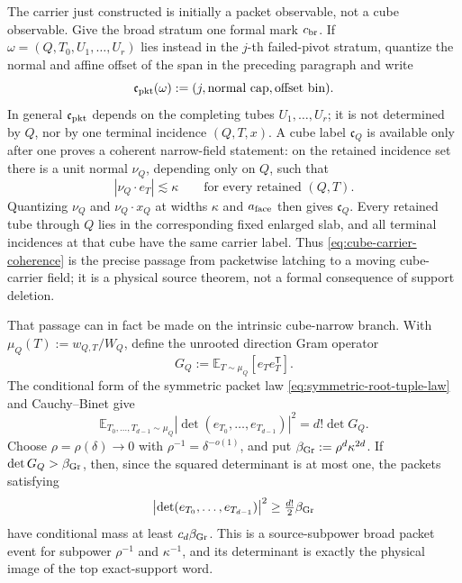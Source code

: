 \documentclass[11pt]{article}
\begin{document}
The carrier just constructed is initially a packet observable, not a cube
observable.  Give the broad stratum one formal mark \(c_{\rm br}\).  If
\(\omega=(Q,T_0,U_1,\ldots,U_r)\) lies instead in the \(j\)-th failed-pivot
stratum, quantize the normal and affine offset of the span in the preceding
paragraph and write
\begin{equation}\label{eq:packet-carrier-label}
 \mathfrak c_{\rm pkt}(\omega)
 :=(j,\text{normal cap},\text{offset bin}).
\end{equation}
In general \(\mathfrak c_{\rm pkt}\) depends on the completing tubes
\(U_1,\ldots,U_r\); it is not determined by \(Q\), nor by one terminal
incidence \((Q,T,x)\).  A cube label \(\mathfrak c_Q\) is available only after
one proves a coherent narrow-field statement: on the retained incidence set
there is a unit normal \(\nu_Q\), depending only on \(Q\), such that
\begin{equation}\label{eq:cube-carrier-coherence}
 |\nu_Q\cdot e_T|\lesssim\kappa
 \qquad\text{for every retained }(Q,T).
\end{equation}
Quantizing \(\nu_Q\) and \(\nu_Q\cdot x_Q\) at widths
\(\kappa\) and \(a_{\rm face}\) then gives \(\mathfrak c_Q\).  Every retained
tube through \(Q\) lies in the corresponding fixed enlarged slab, and all
terminal incidences at that cube have the same carrier label.  Thus
\eqref{eq:cube-carrier-coherence} is the precise passage from packetwise
latching to a moving cube-carrier field; it is a physical source theorem, not a
formal consequence of support deletion.

That passage can in fact be made on the intrinsic cube-narrow branch.  With
\(\mu_Q(T):=w_{Q,T}/W_Q\), define the unrooted direction Gram operator
\[
 G_Q:=\mathbb E_{T\sim\mu_Q}[e_Te_T^{\mathsf T}].
\]
The conditional form of the symmetric packet law
\eqref{eq:symmetric-root-tuple-law} and Cauchy--Binet give
\begin{equation}\label{eq:unrooted-cube-cauchy-binet}
 \mathbb E_{T_0,\ldots,T_{d-1}\sim\mu_Q}
 \left|\det(e_{T_0},\ldots,e_{T_{d-1}})\right|^2
 =d!\det G_Q.
\end{equation}
Choose \(\rho=\rho(\delta)\to0\) with
\(\rho^{-1}=\delta^{-o(1)}\), and put
\(\beta_{\rm Gr}:=\rho^d\kappa^{2d}\).  If
\(\det G_Q>\beta_{\rm Gr}\), then, since the squared determinant is at most
one, the packets satisfying
\begin{equation}\label{eq:cube-broad-packet-event}
 \left|\det(e_{T_0},\ldots,e_{T_{d-1}})\right|^2
 \ge \tfrac{d!}{2}\beta_{\rm Gr}
\end{equation}
have conditional mass at least \(c_d\beta_{\rm Gr}\).  This is a
source-subpower broad packet event for subpower \(\rho^{-1}\) and
\(\kappa^{-1}\), and its determinant is exactly the physical image of the top
exact-support word.
\end{document}
